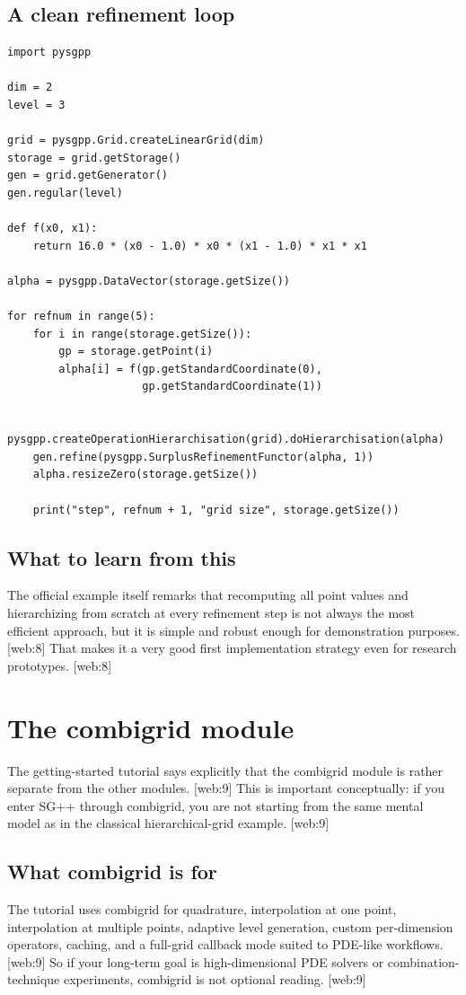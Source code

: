 \documentclass[11pt,a4paper]{article}
\begin{document}
\subsection{A clean refinement loop}
\begin{lstlisting}[style=py]
import pysgpp

dim = 2
level = 3

grid = pysgpp.Grid.createLinearGrid(dim)
storage = grid.getStorage()
gen = grid.getGenerator()
gen.regular(level)

def f(x0, x1):
    return 16.0 * (x0 - 1.0) * x0 * (x1 - 1.0) * x1 * x1

alpha = pysgpp.DataVector(storage.getSize())

for refnum in range(5):
    for i in range(storage.getSize()):
        gp = storage.getPoint(i)
        alpha[i] = f(gp.getStandardCoordinate(0),
                     gp.getStandardCoordinate(1))

    pysgpp.createOperationHierarchisation(grid).doHierarchisation(alpha)
    gen.refine(pysgpp.SurplusRefinementFunctor(alpha, 1))
    alpha.resizeZero(storage.getSize())

    print("step", refnum + 1, "grid size", storage.getSize())
\end{lstlisting}

\subsection{What to learn from this}
The official example itself remarks that recomputing all point values and hierarchizing from scratch at every refinement step is not always the most efficient approach, but it is simple and robust enough for demonstration purposes. [web:8]  
That makes it a very good first implementation strategy even for research prototypes. [web:8]  

\section{The combigrid module}

The getting-started tutorial says explicitly that the combigrid module is rather separate from the other modules. [web:9]  
This is important conceptually: if you enter SG++ through combigrid, you are not starting from the same mental model as in the classical hierarchical-grid example. [web:9]  

\subsection{What combigrid is for}
The tutorial uses combigrid for quadrature, interpolation at one point, interpolation at multiple points, adaptive level generation, custom per-dimension operators, caching, and a full-grid callback mode suited to PDE-like workflows. [web:9]  
So if your long-term goal is high-dimensional PDE solvers or combination-technique experiments, combigrid is not optional reading. [web:9]  
\end{document}
